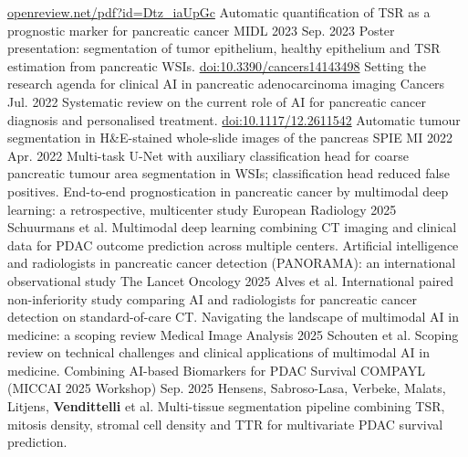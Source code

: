 \begin{cventries}
    \vspace{1mm}
    \cventry
        {\href{https://openreview.net/pdf?id=Dtz_iaUpGc}{openreview.net/pdf?id=Dtz\_iaUpGc}}
        {Automatic quantification of TSR as a prognostic marker for pancreatic cancer}
        {MIDL 2023}
        {Sep. 2023}
        {Poster presentation: segmentation of tumor epithelium, healthy epithelium and TSR estimation from pancreatic WSIs.}
    \vspace{1mm}
    \cventry
        {\href{https://www.mdpi.com/2072-6694/14/14/3498}{doi:10.3390/cancers14143498}}
        {Setting the research agenda for clinical AI in pancreatic adenocarcinoma imaging}
        {Cancers}
        {Jul. 2022}
        {Systematic review on the current role of AI for pancreatic cancer diagnosis and personalised treatment.}
    \vspace{1mm}
    \cventry
        {\href{https://www.spiedigitallibrary.org/conference-proceedings-of-spie/12039/120391F/Automatic-tumour-segmentation-in-HE-stained-whole-slide-images-of/10.1117/12.2611542.short}{doi:10.1117/12.2611542}}
        {Automatic tumour segmentation in H\&E-stained whole-slide images of the pancreas}
        {SPIE MI 2022}
        {Apr. 2022}
        {Multi-task U-Net with auxiliary classification head for coarse pancreatic tumour area segmentation in WSIs; classification head reduced false positives.}
    \vspace{1mm}
    \cventry
        {}
        {End-to-end prognostication in pancreatic cancer by multimodal deep learning: a retrospective, multicenter study}
        {European Radiology}
        {2025}
        {Schuurmans et al. Multimodal deep learning combining CT imaging and clinical data for PDAC outcome prediction across multiple centers.}
    \vspace{1mm}
    \cventry
        {}
        {Artificial intelligence and radiologists in pancreatic cancer detection (PANORAMA): an international observational study}
        {The Lancet Oncology}
        {2025}
        {Alves et al. International paired non-inferiority study comparing AI and radiologists for pancreatic cancer detection on standard-of-care CT.}
    \vspace{1mm}
    \cventry
        {}
        {Navigating the landscape of multimodal AI in medicine: a scoping review}
        {Medical Image Analysis}
        {2025}
        {Schouten et al. Scoping review on technical challenges and clinical applications of multimodal AI in medicine.}
    \vspace{1mm}
    \cventry
        {}
        {Combining AI-based Biomarkers for PDAC Survival}
        {COMPAYL (MICCAI 2025 Workshop)}
        {Sep. 2025}
        {Hensens, Sabroso-Lasa, Verbeke, Malats, Litjens, \textbf{Vendittelli} et al. Multi-tissue segmentation pipeline combining TSR, mitosis density, stromal cell density and TTR for multivariate PDAC survival prediction.}

\end{cventries}
